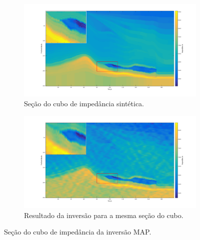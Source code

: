 \begin{figure}[ht]
\centering
\begin{subfigure}{.8\textwidth}
  \centering
  \includegraphics[width=.9\linewidth]{fig/impedance_mount}
  \caption{Seção do cubo de impedância sintética.}
  \label{fig:impedancehr}
\end{subfigure}
\begin{subfigure}{.8\textwidth}
  \centering
  \includegraphics[width=.9\linewidth]{fig/inversion_mount}
  \caption{Resultado da inversão para a mesma seção do cubo.}
  \label{fig:impedancelr}
\end{subfigure}%
\caption{Seção do cubo de impedância da inversão MAP.}
\label{fig:ipedances}
\end{figure}

